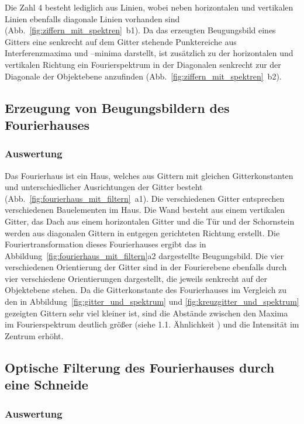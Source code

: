Die Zahl 4 besteht lediglich aus Linien, wobei neben horizontalen und vertikalen Linien ebenfalls diagonale Linien vorhanden sind (Abb.~\ref{fig:ziffern_mit_spektren}~b1). Da das erzeugten Beugungsbild eines Gitters eine senkrecht auf dem Gitter stehende Punktereiche aus Interferenzmaxima und –minima darstellt, ist zusätzlich zu der horizontalen und vertikalen Richtung ein Fourierspektrum in der Diagonalen senkrecht zur der Diagonale der Objektebene anzufinden (Abb.~\ref{fig:ziffern_mit_spektren}~b2).

\subsection{Erzeugung von Beugungsbildern des Fourierhauses}
\subsubsection*{Auswertung}

Das Fourierhaus ist ein Haus, welches aus Gittern mit gleichen Gitterkonstanten und unterschiedlicher Ausrichtungen der Gitter besteht (Abb.~\ref{fig:fourierhaus_mit_filtern}~a1). Die verschiedenen Gitter entsprechen verschiedenen Bauelementen im Haus. Die Wand besteht aus einem vertikalen Gitter, das Dach aus einem horizontalen Gitter und die Tür und der Schornstein werden aus diagonalen Gittern in entgegen gerichteten Richtung erstellt. Die Fouriertransformation dieses Fourierhauses ergibt das in Abbildung~\ref{fig:fourierhaus_mit_filtern}a2 dargestellte Beugungsbild. Die vier verschiedenen Orientierung der Gitter sind in der Fourierebene ebenfalls durch vier verschiedene Orientierungen dargestellt, die jeweils senkrecht auf der Objektebene stehen. Da die Gitterkonstante des Fourierhauses im Vergleich zu den in Abbildung~\ref{fig:gitter_und_spektrum} und \ref{fig:kreuzgitter_und_spektrum} gezeigten Gittern sehr viel kleiner ist, sind die Abstände zwischen den Maxima im Fourierspektrum deutlich größer (siehe 1.1. Ähnlichkeit%
 ) und die Intensität im Zentrum erhöht.


\subsection{Optische Filterung des Fourierhauses durch eine Schneide}
\subsubsection*{Auswertung}

